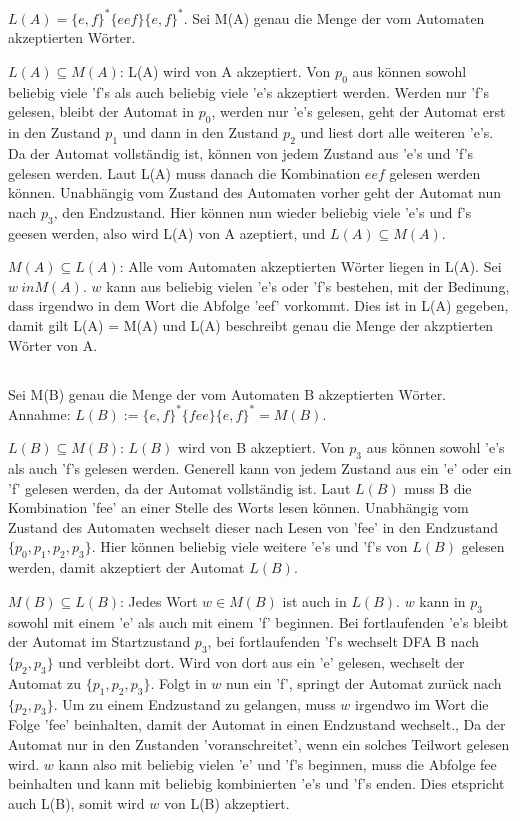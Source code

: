 \documentclass{article}
\begin{document}
\subsection{}
$L(A) =\{e,f\}^*\{eef\}\{e,f\}^*$. Sei M(A) genau die Menge der vom Automaten akzeptierten Wörter. 

$L(A) \subseteq M(A)$: L(A) wird von A akzeptiert. Von $ p_0$ aus können sowohl beliebig viele 'f's als auch beliebig viele 'e's akzeptiert werden.  
Werden nur 'f's gelesen, bleibt der Automat in $p_0$, werden nur 'e's gelesen, geht der Automat erst in den Zustand $p_1$ und 
dann in den Zustand $p_2$ und liest dort alle weiteren 'e's. Da der Automat vollständig ist, können von jedem Zustand aus 
'e's und 'f's gelesen werden. Laut L(A) muss danach die Kombination {$eef$} gelesen werden können. Unabhängig vom Zustand
 des Automaten vorher geht der Automat nun nach $p_3$, den Endzustand. Hier können nun wieder beliebig viele 'e's und f's geesen werden, also 
wird L(A) von A azeptiert, und $L(A) \subseteq M(A)$.   

$M(A) \subseteq L(A)$: Alle vom Automaten akzeptierten Wörter liegen in L(A). Sei $w \ in M(A)$. $w$ kann aus beliebig vielen
'e's oder 'f's bestehen, mit der Bedinung, dass irgendwo in dem Wort die Abfolge 'eef' vorkommt. Dies ist in L(A) gegeben,
 damit gilt L(A) = M(A) und L(A) beschreibt genau die Menge der akzptierten Wörter von A. 

\subsection{}
Sei M(B) genau die Menge der vom Automaten B akzeptierten Wörter. Annahme: $L(B) := \{e,f\}^*\{fee\}\{e,f\}^* = M(B)$.


$L(B) \subseteq M(B)$: $L(B)$ wird von B akzeptiert. Von $p_3$ aus können sowohl 'e's als auch 'f's gelesen werden. 
Generell kann von jedem Zustand aus ein 'e' oder ein 'f' gelesen werden, da der Automat vollständig ist. 
Laut $L(B)$ muss B die Kombination 'fee' an einer Stelle des Worts lesen können. Unabhängig vom Zustand 
des Automaten wechselt dieser nach Lesen von 'fee' in den Endzustand $\{p_0, p_1, p_2, p_3\}$. Hier 
können beliebig viele weitere 'e's und 'f's von $L(B)$ gelesen werden, damit akzeptiert der Automat $L(B)$.
 

$M(B) \subseteq L(B)$: Jedes Wort $w \in M(B)$ ist auch in $L(B)$. $w$ kann in $p_3$ sowohl mit 
einem 'e' als auch mit einem 'f' beginnen. Bei fortlaufenden 'e's bleibt der Automat im Startzustand 
$p_3$, bei fortlaufenden 'f's wechselt DFA B nach $\{p_2, p_3\}$ und verbleibt dort. Wird von dort aus 
ein 'e' gelesen, wechselt der Automat zu $\{p_1, p_2, p_3\}$. Folgt in $w$ nun ein 'f', springt der 
Automat zurück nach $\{p_2, p_3\}$. Um zu einem Endzustand zu gelangen, muss $w$ irgendwo im Wort 
die Folge 'fee' beinhalten, damit der Automat in einen Endzustand wechselt., Da der Automat nur 
in den Zustanden 'voranschreitet', wenn ein solches Teilwort gelesen wird. $w$ kann also mit beliebig 
vielen 'e' und 'f's beginnen, muss die Abfolge {fee} beinhalten und kann mit beliebig kombinierten 
'e's und 'f's enden. Dies etspricht auch L(B), somit wird $w$ von L(B) akzeptiert.


 
\end{document}
